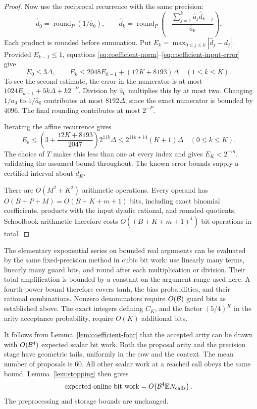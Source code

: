 \begin{proof}
Now use the reciprocal recurrence with the same precision:
\[
 \widehat d_0=\operatorname{round}_P(1/\widehat a_0),\qquad
 \widehat d_k=\operatorname{round}_P\left(
 -\frac{\sum_{j=1}^k\widehat a_j\widehat d_{k-j}}
        {\widehat a_0}\right).
\]
Each product is rounded before summation.  Put
\(E_k=\max_{0\le j\le k}|\widehat d_j-d_j|\).
Provided \(E_{k-1}\le1\), equations
\eqref{eq:coefficient-norm}--\eqref{eq:coefficient-input-error}
give
\[
 E_0\le3\Delta,\qquad
 E_k\le2048E_{k-1}+(12K+8193)\Delta\quad(1\le k\le K).
\]
To see the second estimate, the error in the numerator is at most
\(1024E_{k-1}+5k\Delta+k2^{-P}\).  Division by
\(\widehat a_0\) multiplies this by at most two.  Changing
\(1/a_0\) to \(1/\widehat a_0\) contributes at most
\(8192\Delta\), since the exact numerator is bounded by 4096.
The final rounding contributes at most \(2^{-P}\).

Iterating the affine recurrence gives
\[
 E_k\le\left(3+\frac{12K+8193}{2047}\right)2^{11k}\Delta
 \le2^{11k+14}(K+1)\Delta\quad(0\le k\le K).
\]
The choice of \(T\) makes this less than one at every index and
gives \(E_K<2^{-m}\), validating the assumed bound throughout.
The known error bounds supply a certified interval about
\(\widehat d_K\).

There are \(O(M^2+K^2)\) arithmetic operations.  Every operand
has \(O(B+P+M)=O(B+K+m+1)\) bits, including exact binomial
coefficients, products with the input dyadic rational, and rounded
quotients.  Schoolbook arithmetic therefore costs
\(O((B+K+m+1)^4)\) bit operations in total.
\end{proof}

The elementary exponential series on bounded real arguments can
be evaluated by the same fixed-precision method in cubic bit work:
use linearly many terms, linearly many guard bits, and round after
each multiplication or division.  Their total amplification is
bounded by a constant on the argument range used here.  A fourth-power
bound therefore covers tanh, the bias probabilities, and their
rational combinations.  Nonzero denominators require \(O(\mathcal B)\)
guard bits as established above.  The exact integers defining
\(C_K\), and the factor \((5/4)^K\) in the arity acceptance
probability, require \(O(K)\) additional bits.

It follows from Lemma~\ref{lem:coefficient-four} that the accepted
arity can be drawn with \(O(\mathcal B^4)\) expected scalar bit work.
Both the proposal arity and the precision stage have geometric
tails, uniformly in the row and the context.  The mean number of
proposals is 60.  All other scalar work at a reached call obeys the
same bound.  Lemma~\ref{lem:stopping} then gives
\begin{equation}\label{eq:fourth-power-overhead}
 \text{expected online bit work}
 =O\!\left(\mathcal B^4\mathbb E N_{\rm calls}\right).
\end{equation}
The preprocessing and storage bounds are unchanged.
